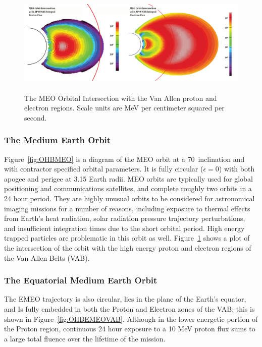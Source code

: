 \documentclass[11pt]{article}
\begin{document}
\begin{figure}[!b]
    \centering
    \includegraphics[height=2in]{MEO_Flux.png}
    \caption{The MEO Orbital Intersection with the Van Allen proton and electron regions. Scale units are MeV per centimeter squared per second.}
    \label{fig:OHBMEOVAB}
\end{figure}

\subsubsection{The Medium Earth Orbit}

Figure~\ref{fig:OHBMEO} is a diagram of the MEO orbit at a 70\degree~inclination and with contractor specified orbital parameters. It is fully circular ($\epsilon=0$) with both apogee and perigee at 3.15 Earth radii. MEO orbits are typically used for global positioning and communications satellites, and complete roughly two orbits in a 24 hour period. They are highly unusual orbits to be considered for astronomical imaging missions for a number of reasons, including exposure to thermal effects from Earth's heat radiation, solar radiation pressure trajectory perturbations, and insufficient integration times due to the short orbital period. High energy trapped particles are problematic in this orbit as well. Figure~\ref{fig:OHBMEOVAB} shows a plot of the intersection of the orbit with the high energy proton and electron regions of the Van Allen Belts (VAB).

\subsubsection{The Equatorial Medium Earth Orbit}

The EMEO trajectory is also circular, lies in the plane of the Earth's equator, and Is fully embedded in both the Proton and Electron zones of the VAB: this is shown in Figure~\ref{fig:OHBEMEOVAB}. Although in the lower energetic portion of the Proton region, continuous 24 hour exposure to a 10 MeV proton flux sums to a large total fluence over the lifetime of the mission. 
\end{document}
